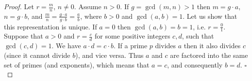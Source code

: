 \documentclass[10pt,varwidth=6in,margin=0.2in,preview]{standalone}
\begin{document}
\begin{flushleft}
\begin{proof}
Let $r = \frac{m}{n}$, $n \neq 0$.
Assume $n > 0$.
If $g = \gcd(m, n) > 1$ then $m = g \cdot a$, $n = g \cdot b$, and $\frac{m}{n} = \frac{g \cdot a}{g \cdot b} = \frac{a}{b}$, where $b > 0$ and $\gcd(a, b) = 1$.
Let us show that this representation is unique.
If $a = 0$ then $\gcd(a, b) = b = 1$, i.e. $r = \frac{0}{1}$.
Suppose that $a > 0$ 
and $r = \frac{c}{d}$ for some positive integers $c, d$, such that $\gcd(c, d) = 1$.
We have $a \cdot d = c \cdot b$.
If a prime $p$ divides $a$ then it also divides $c$ (since it cannot divide $b$), and vice versa. 
Thus $a$ and $c$ are factored into the same set of primes (and exponents), which means that $a = c$, and consequently $b = d$. $\square$
\end{proof}


\end{flushleft}
\end{document}
